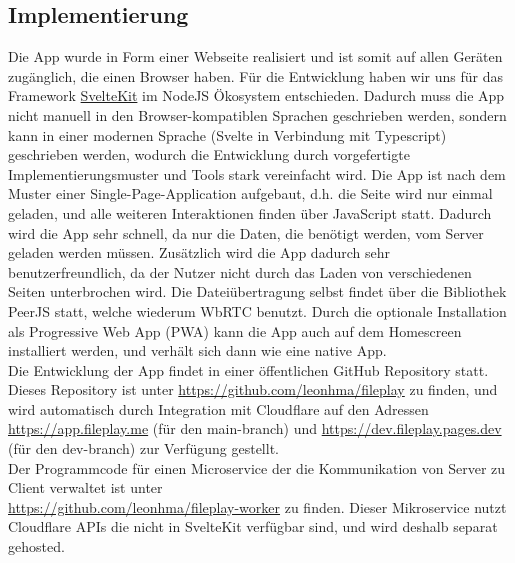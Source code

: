 \documentclass[a4paper]{article}
\begin{document}
\subsection{Implementierung}
Die App wurde in Form einer Webseite realisiert und ist somit auf allen Geräten
zugänglich, die einen Browser haben. Für die Entwicklung haben wir uns für das
Framework \href{https://kit.svelte.dev/}{SvelteKit} im NodeJS Ökosystem
entschieden. Dadurch muss die App nicht manuell in den Browser-kompatiblen
Sprachen geschrieben werden, sondern kann in einer modernen Sprache (Svelte in
Verbindung mit Typescript) geschrieben werden, wodurch die Entwicklung durch
vorgefertigte Implementierungsmuster und Tools stark vereinfacht wird. Die App
ist nach dem Muster einer Single-Page-Application aufgebaut, d.h. die Seite wird
nur einmal geladen, und alle weiteren Interaktionen finden über JavaScript
statt. Dadurch wird die App sehr schnell, da nur die Daten, die benötigt werden,
vom Server geladen werden müssen. Zusätzlich wird die App dadurch sehr
benutzerfreundlich, da der Nutzer nicht durch das Laden von verschiedenen Seiten
unterbrochen wird. Die Dateiübertragung selbst findet über die Bibliothek PeerJS
statt, welche wiederum WbRTC benutzt. Durch die optionale Installation als
Progressive Web App (PWA) kann die App auch auf dem Homescreen installiert
werden, und verhält sich dann wie eine native App.\\
Die Entwicklung der App findet in einer öffentlichen GitHub Repository statt.
Dieses Repository ist unter \url{https://github.com/leonhma/fileplay} zu finden,
und wird automatisch durch Integration mit Cloudflare auf den Adressen
\url{https://app.fileplay.me} (für den {main}-branch) und
\url{https://dev.fileplay.pages.dev} (für den {dev}-branch) zur Verfügung
gestellt.\\
Der Programmcode für einen Microservice der die Kommunikation von Server zu
Client verwaltet ist unter \\\url{https://github.com/leonhma/fileplay-worker} zu
finden. Dieser Mikroservice nutzt Cloudflare APIs die nicht in SvelteKit
verfügbar sind, und wird deshalb separat gehosted.
\end{document}
